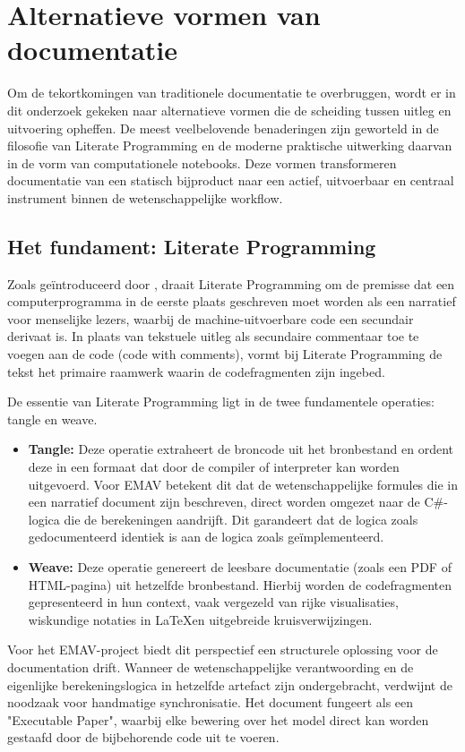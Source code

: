 \chapter{Alternatieve vormen van documentatie}
\label{ch:documentatie_vormen}

Om de tekortkomingen van traditionele documentatie te overbruggen, wordt er in dit onderzoek gekeken naar alternatieve vormen die de scheiding tussen uitleg en uitvoering opheffen. De meest veelbelovende benaderingen zijn geworteld in de filosofie van Literate Programming en de moderne praktische uitwerking daarvan in de vorm van computationele notebooks. Deze vormen transformeren documentatie van een statisch bijproduct naar een actief, uitvoerbaar en centraal instrument binnen de wetenschappelijke workflow.

\section{Het fundament: Literate Programming}
Zoals geïntroduceerd door \textcite{Knuth1984}, draait Literate Programming om de premisse dat een computerprogramma in de eerste plaats geschreven moet worden als een narratief voor menselijke lezers, waarbij de machine-uitvoerbare code een secundair derivaat is. In plaats van tekstuele uitleg als secundaire commentaar toe te voegen aan de code (code with comments), vormt bij Literate Programming de tekst het primaire raamwerk waarin de codefragmenten zijn ingebed.

De essentie van Literate Programming ligt in de twee fundamentele operaties: tangle en weave. 
\begin{itemize}
    \item \textbf{Tangle:} Deze operatie extraheert de broncode uit het bronbestand en ordent deze in een formaat dat door de compiler of interpreter kan worden uitgevoerd. Voor EMAV betekent dit dat de wetenschappelijke formules die in een narratief document zijn beschreven, direct worden omgezet naar de C\#-logica die de berekeningen aandrijft. Dit garandeert dat de logica zoals gedocumenteerd identiek is aan de logica zoals geïmplementeerd.
    \item \textbf{Weave:} Deze operatie genereert de leesbare documentatie (zoals een PDF of HTML-pagina) uit hetzelfde bronbestand. Hierbij worden de codefragmenten gepresenteerd in hun context, vaak vergezeld van rijke visualisaties, wiskundige notaties in \LaTeX \@ en uitgebreide kruisverwijzingen.
\end{itemize}
Voor het EMAV-project biedt dit perspectief een structurele oplossing voor de documentation drift. Wanneer de wetenschappelijke verantwoording en de eigenlijke berekeningslogica in hetzelfde artefact zijn ondergebracht, verdwijnt de noodzaak voor handmatige synchronisatie. Het document fungeert als een "Executable Paper", waarbij elke bewering over het model direct kan worden gestaafd door de bijbehorende code uit te voeren.

